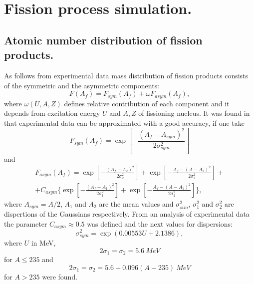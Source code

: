 \section{Fission process simulation.}

\subsection{Atomic number distribution of fission products.}

\hspace{1.0em}As follows from experimental data \cite{VH73} mass
distribution of fission products consists of the symmetric and the
asymmetric components:
\begin{equation}
\label{FPS1} F(A_f) = F_{sym}(A_f) + \omega F_{asym}(A_f),
\end{equation}
where $\omega(U,A,Z)$ defines relative contribution of each component
and it depends from excitation energy $U$ and $A,Z$ of fissioning
nucleus.  It was found in \cite{ABIM93} that experimental data can be
approximated with a good accuracy, if one take
\begin{equation}
\label{FPS2} F_{sym}(A_f) = \exp{[-\frac{(A_f - A_{sym})^2}{2\sigma_{sym}^2}]}
\end{equation}
and
\begin{equation}
\begin{array}{c}
\label{FPS3} F_{asym}(A_f) = \exp{[-\frac{(A_f - A_{2})^2}{2\sigma_{2}^2}]} + 
\exp{[-\frac{{A_f - (A - A_{2})}^2}{2\sigma_{2}^2}]} + \\
+ C_{asym}\{\exp{[-\frac{(A_f - A_{1})^2}{2\sigma_{1}^2}]} + 
\exp{[-\frac{{A_f - (A - A_{1})}^2}{2\sigma_{2}^2}]}\},
\end{array}
\end{equation}
where $A_{sym} = A/2$, $A_1$ and $A_2$ are the mean values and
$\sigma^2_{sim}$, $\sigma^2_1$ and $\sigma^2_2$ are dispertions of the
Gaussians respectively.  From an analysis of experimental data
\cite{ABIM93} the parameter $C_{asym} \approx 0.5$ was defined and the
next values for dispersions:
\begin{equation}
\label{FPS4} \sigma^2_{sym} = \exp{(0.00553U + 2.1386)},
\end{equation} 
where $U$ in MeV, 
\begin{equation}
\label{FPS5} 2\sigma_1 = \sigma_2 = 5.6 \ MeV
\end{equation}
for $A \leq 235$ and 
\begin{equation}
\label{FPS6} 2\sigma_1 = \sigma_2 = 5.6 + 0.096 (A - 235) \ MeV
\end{equation}
for $A > 235$ were found.

